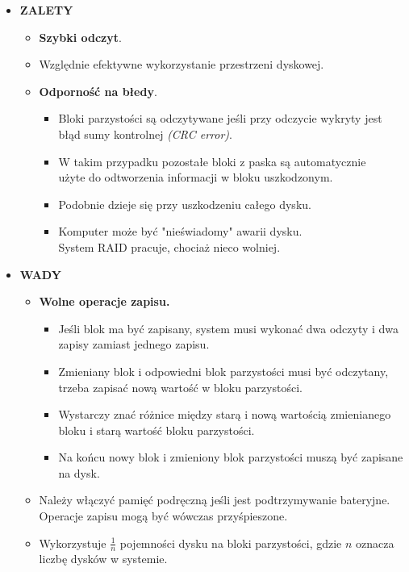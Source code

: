 \documentclass[a5paper,6pt]{article}
\begin{document}
    \begin{itemize}
        \item \textbf{ZALETY}
        \begin{itemize}
            \item \textbf{Szybki odczyt}.
            \item Względnie efektywne wykorzystanie przestrzeni dyskowej.
            \item \textbf{Odporność na błedy}.
            \begin{itemize}
                \item Bloki parzystości są odczytywane jeśli przy odczycie
                      wykryty jest błąd sumy kontrolnej \textit{(CRC error)}.
                \item W takim przypadku pozostałe bloki z paska są automatycznie
                      \\użyte do odtworzenia informacji w bloku uszkodzonym.
                \item Podobnie dzieje się przy uszkodzeniu całego dysku.
                \item Komputer może być "nieświadomy" awarii dysku.\\
                      System RAID pracuje, chociaż nieco wolniej.
            \end{itemize}
        \end{itemize}

        \item \textbf{WADY}
        \begin{itemize}
            \item \textbf{Wolne operacje zapisu.}
            \begin{itemize}
                \item Jeśli blok ma być zapisany, system musi wykonać dwa
                      odczyty i dwa zapisy zamiast jednego zapisu.
                \item Zmieniany blok i odpowiedni blok parzystości musi być
                      odczytany, trzeba zapisać nową wartość w bloku
                      parzystości.
                \item Wystarczy znać różnice między starą i nową wartością
                      zmienianego bloku i starą wartość bloku parzystości.
                \item Na końcu nowy blok i zmieniony blok parzystości muszą
                      być zapisane na dysk.
            \end{itemize}
            \item Należy włączyć pamięć podręczną jeśli jest podtrzymywanie
                  bateryjne. Operacje zapisu mogą być wówczas przyśpieszone.
            \item Wykorzystuje $\frac{1}{n}$ pojemności dysku na bloki
                  parzystości, gdzie $n$ oznacza liczbę dysków w systemie.
        \end{itemize}


\end{itemize}
\end{document}
